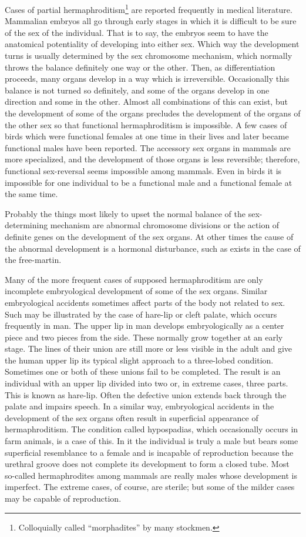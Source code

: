 Cases of partial hermaphroditism\footnote{Colloquially called
``morphadites'' by many stockmen.} are reported frequently in medical
literature. Mammalian embryos all go through early stages in which
it is difficult to be sure of the sex of the individual. That is to say, the
embryos seem to have the anatomical potentiality of developing into
either sex. Which way the development turns is usually determined by
the sex chromosome mechanism, which normally throws the balance
definitely one way or the other. Then, as differentiation proceeds, many
organs develop in a way which is irreversible. Occasionally this balance
is not turned so definitely, and some of the organs develop in one direction
and some in the other. Almost all combinations of this can exist,
but the development of some of the organs precludes the development
of the organs of the other sex so that functional hermaphroditism is
impossible. A few cases of birds which were functional females at one
time in their lives and later became functional males have been
reported. The accessory sex organs in mammals are more specialized,
and the development of those organs is less reversible; therefore, functional
sex-reversal seems impossible among mammals. Even in birds
it is impossible for one individual to be a functional male and a functional
female at the same time.

Probably the things most likely to upset the normal balance of the
sex-determining mechanism are abnormal chromosome divisions or the
action of definite genes on the development of the sex organs. At other
times the cause of the abnormal development is a hormonal disturbance,
such as exists in the case of the free-martin.

Many of the more frequent cases of supposed hermaphroditism are
only incomplete embryological development of some of the sex organs.
Similar embryological accidents sometimes affect parts of the body not
related to sex. Such may be illustrated by the case of hare-lip or cleft
palate, which occurs frequently in man. The upper lip in man develops
embryologically as a center piece and two pieces from the side. These
normally grow together at an early stage. The lines of their union are
still more or less visible in the adult and give the human upper lip its
typical slight approach to a three-lobed condition. Sometimes one or
both of these unions fail to be completed. The result is an individual
with an upper lip divided into two or, in extreme cases, three parts.
This is known as hare-lip. Often the defective union extends back
through the palate and impairs speech. In a similar way, embryological
accidents in the development of the sex organs often result in superficial
appearance of hermaphroditism. The condition called hypospadias,
which occasionally occurs in farm animals, is a case of this. In it the
individual is truly a male but bears some superficial resemblance to a
female and is incapable of reproduction because the urethral groove
does not complete its development to form a closed tube. Most so-called
hermaphrodites among mammals are really males whose development
is imperfect. The extreme cases, of course, are sterile; but some of the
milder cases may be capable of reproduction.

